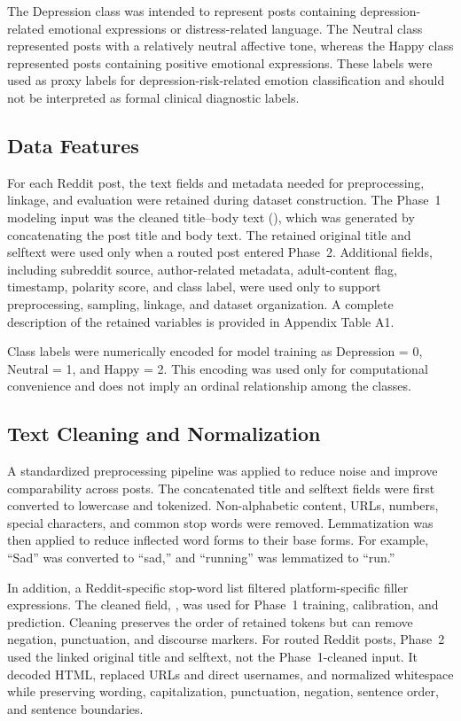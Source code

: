 \documentclass{ieeeaccess}
\begin{document}
The Depression class was intended to represent posts containing depression-related emotional expressions or distress-related language. The Neutral class represented posts with a relatively neutral affective tone, whereas the Happy class represented posts containing positive emotional expressions. These labels were used as proxy labels for depression-risk-related emotion classification and should not be interpreted as formal clinical diagnostic labels.

\subsection{Data Features}

For each Reddit post, the text fields and metadata needed for preprocessing, linkage, and evaluation were retained during dataset construction. The Phase~1 modeling input was the cleaned title--body text (), which was generated by concatenating the post title and body text. The retained original title and selftext were used only when a routed post entered Phase~2. Additional fields, including subreddit source, author-related metadata, adult-content flag, timestamp, polarity score, and class label, were used only to support preprocessing, sampling, linkage, and dataset organization. A complete description of the retained variables is provided in Appendix Table A1.

Class labels were numerically encoded for model training as Depression = 0, Neutral = 1, and Happy = 2. This encoding was used only for computational convenience and does not imply an ordinal relationship among the classes.

\subsection{Text Cleaning and Normalization}

A standardized preprocessing pipeline was applied to reduce noise and improve comparability across posts. The concatenated title and selftext fields were first converted to lowercase and tokenized. Non-alphabetic content, URLs, numbers, special characters, and common stop words were removed. Lemmatization was then applied to reduce inflected word forms to their base forms. For example, ``Sad'' was converted to ``sad,'' and ``running'' was lemmatized to ``run.''

In addition, a Reddit-specific stop-word list filtered platform-specific filler expressions. The cleaned field, , was used for Phase~1 training, calibration, and prediction. Cleaning preserves the order of retained tokens but can remove negation, punctuation, and discourse markers. For routed Reddit posts, Phase~2 used the linked original title and selftext, not the Phase~1-cleaned input. It decoded HTML, replaced URLs and direct usernames, and normalized whitespace while preserving wording, capitalization, punctuation, negation, sentence order, and sentence boundaries.
\end{document}
